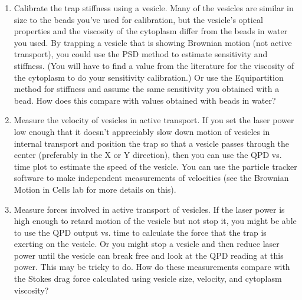 \documentclass{../lab}
\begin{document}
\begin{enumerate}


    \item Calibrate the trap stiffness using a vesicle. Many of the vesicles are similar in size to the beads you've used for calibration, but the vesicle's optical properties and the viscosity of the cytoplasm differ from the beads in water you used. By trapping a vesicle that is showing Brownian motion (not active transport), you could use the PSD method to estimate sensitivity and stiffness. (You will have to find a value from the literature for the viscosity of the cytoplasm to do your sensitivity calibration.) Or use the Equipartition method for stiffness and assume the same sensitivity you obtained with a bead. How does this compare with values obtained with beads in water?

    \item Measure the velocity of vesicles in active transport. If you set the laser power low enough that it doesn't appreciably slow down motion of vesicles in internal transport and position the trap so that a vesicle passes through the center (preferably in the X or Y direction), then you can use the QPD vs. time plot to estimate the speed of the vesicle. You can use the particle tracker software to make independent measurements of velocities (see the Brownian Motion in Cells lab for more details on this).

    \item Measure forces involved in active transport of vesicles. If the laser power is high enough to retard motion of the vesicle but not stop it, you might be able to use the QPD output vs. time to calculate the force that the trap is exerting on the vesicle. Or you might stop a vesicle and then reduce laser power until the vesicle can break free and look at the QPD reading at this power. This may be tricky to do. How do these measurements compare with the Stokes drag force calculated using vesicle size, velocity, and cytoplasm viscosity?

\end{enumerate}


\end{document}
